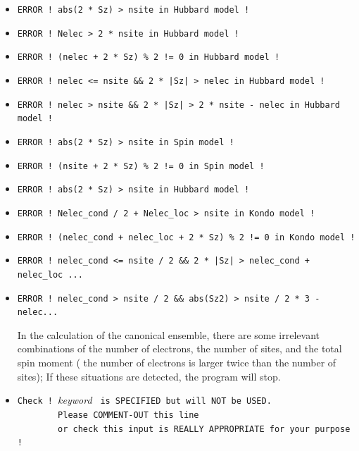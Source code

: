 \begin{itemize}
\item \verb#ERROR ! abs(2 * Sz) > nsite in Hubbard model !# \vspace{-0.3cm}
\item \verb#ERROR ! Nelec > 2 * nsite in Hubbard model !#\vspace{-0.3cm}
\item \verb#ERROR ! (nelec + 2 * Sz) % 2 != 0 in Hubbard model !#\vspace{-0.3cm}
\item \verb#ERROR ! nelec <= nsite && 2 * |Sz| > nelec in Hubbard model !#\vspace{-0.3cm}
\item \verb#ERROR ! nelec > nsite && 2 * |Sz| > 2 * nsite - nelec in Hubbard model !#\vspace{-0.3cm}
\item \verb#ERROR ! abs(2 * Sz) > nsite in Spin model !#\vspace{-0.3cm}
\item \verb#ERROR ! (nsite + 2 * Sz) % 2 != 0 in Spin model !#\vspace{-0.3cm}
\item \verb#ERROR ! abs(2 * Sz) > nsite in Hubbard model !#\vspace{-0.3cm}
\item \verb#ERROR ! Nelec_cond / 2 + Nelec_loc > nsite in Kondo model !#\vspace{-0.3cm}
\item \verb#ERROR ! (nelec_cond + nelec_loc + 2 * Sz) % 2 != 0 in Kondo model !#\vspace{-0.3cm}
\item \verb#ERROR ! nelec_cond <= nsite / 2 && 2 * |Sz| > nelec_cond + nelec_loc ...#\vspace{-0.3cm}
\item \verb#ERROR ! nelec_cond > nsite / 2 && abs(Sz2) > nsite / 2 * 3 - nelec...#

In the calculation of the canonical ensemble, 
there are some irrelevant combinations of the number of electrons, the number of sites, and the total spin moment
( the number of electrons is larger twice than the number of sites);
If these situations are detected, the program will stop.

\item \verb|Check ! |\textit{keyword} \verb| is SPECIFIED but will NOT be USED.|\\
      \verb|        Please COMMENT-OUT this line|\\
      \verb|        or check this input is REALLY APPROPRIATE for your purpose !|


\end{itemize}
